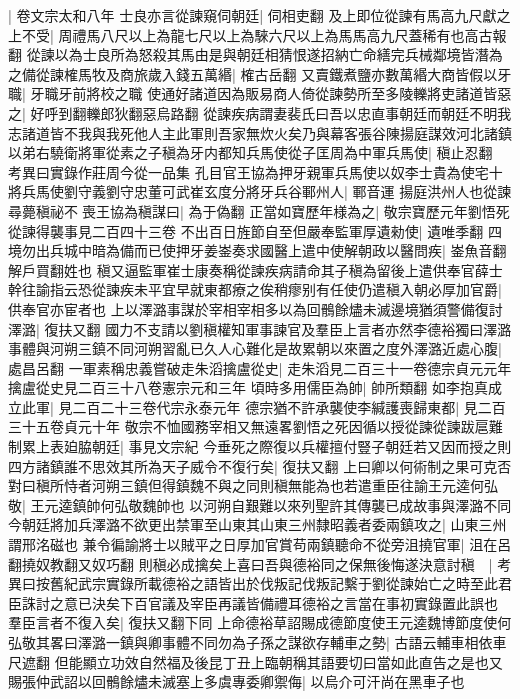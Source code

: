|{
	卷文宗太和八年}
士良亦言從諫窺伺朝廷|{
	伺相吏翻}
及上即位從諫有馬高九尺獻之上不受|{
	周禮馬八尺以上為龍七尺以上為騋六尺以上為馬馬高九尺蓋稀有也高古報翻}
從諫以為士良所為怒殺其馬由是與朝廷相猜恨遂招納亡命繕完兵械鄰境皆潛為之備從諫榷馬牧及商旅歲入錢五萬緡|{
	榷古岳翻}
又賣鐵煮鹽亦數萬緡大商皆假以牙職|{
	牙職牙前將校之職}
使通好諸道因為販易商人倚從諫勢所至多陵轢將吏諸道皆惡之|{
	好呼到翻轢郎狄翻惡烏路翻}
從諫疾病謂妻裴氏曰吾以忠直事朝廷而朝廷不明我志諸道皆不我與我死他人主此軍則吾家無炊火矣乃與幕客張谷陳揚庭謀效河北諸鎮以弟右驍衛將軍從素之子稹為牙内都知兵馬使從子匡周為中軍兵馬使|{
	稹止忍翻　考異曰實錄作莊周今從一品集}
孔目官王協為押牙親軍兵馬使以奴李士貴為使宅十將兵馬使劉守義劉守忠董可武崔玄度分將牙兵谷鄆州人|{
	鄆音運}
揚庭洪州人也從諫尋薨稹祕不喪王協為稹謀曰|{
	為于偽翻}
正當如寶歷年様為之|{
	敬宗寶歷元年劉悟死從諫得襲事見二百四十三卷}
不出百日旌節自至但嚴奉監軍厚遺勑使|{
	遺唯季翻}
四境勿出兵城中暗為備而已使押牙姜崟奏求國醫上遣中使解朝政以醫問疾|{
	崟魚音翻解戶買翻姓也}
稹又逼監軍崔士康奏稱從諫疾病請命其子稹為留後上遣供奉官薛士幹往諭指云恐從諫疾未平宜早就東都療之俟稍瘳别有任使仍遣稹入朝必厚加官爵|{
	供奉官亦宦者也}
上以澤潞事謀於宰相宰相多以為回鶻餘燼未滅邊境猶須警備復討澤潞|{
	復扶又翻}
國力不支請以劉稹權知軍事諫官及羣臣上言者亦然李德裕獨曰澤潞事體與河朔三鎮不同河朔習亂已久人心難化是故累朝以來置之度外澤潞近處心腹|{
	處昌呂翻}
一軍素稱忠義嘗破走朱滔擒盧從史|{
	走朱滔見二百三十一卷德宗貞元元年擒盧從史見二百三十八卷憲宗元和三年}
頃時多用儒臣為帥|{
	帥所類翻}
如李抱真成立此軍|{
	見二百二十三卷代宗永泰元年}
德宗猶不許承襲使李緘護喪歸東都|{
	見二百三十五卷貞元十年}
敬宗不恤國務宰相又無遠畧劉悟之死因循以授從諫從諫跋扈難制累上表廹脇朝廷|{
	事見文宗紀}
今垂死之際復以兵權擅付豎子朝廷若又因而授之則四方諸鎮誰不思效其所為天子威令不復行矣|{
	復扶又翻}
上曰卿以何術制之果可克否對曰稹所恃者河朔三鎮但得鎮魏不與之同則稹無能為也若遣重臣往諭王元逵何弘敬|{
	王元逵鎮帥何弘敬魏帥也}
以河朔自艱難以來列聖許其傳襲已成故事與澤潞不同今朝廷將加兵澤潞不欲更出禁軍至山東其山東三州隸昭義者委兩鎮攻之|{
	山東三州謂邢洺磁也}
兼令徧諭將士以賊平之日厚加官賞苟兩鎮聽命不從旁沮撓官軍|{
	沮在呂翻撓奴教翻又奴巧翻}
則稹必成擒矣上喜曰吾與德裕同之保無後悔遂決意討稹　|{
	考異曰按舊紀武宗實錄所載德裕之語皆出於伐叛記伐叛記繫于劉從諫始亡之時至此君臣誅討之意已決矣下百官議及宰臣再議皆備禮耳德裕之言當在事初實錄置此誤也}
羣臣言者不復入矣|{
	復扶又翻下同}
上命德裕草詔賜成德節度使王元逵魏博節度使何弘敬其畧曰澤潞一鎮與卿事體不同勿為子孫之謀欲存輔車之勢|{
	古語云輔車相依車尺遮翻}
但能顯立功效自然福及後昆丁丑上臨朝稱其語要切曰當如此直告之是也又賜張仲武詔以回鶻餘燼未滅塞上多虞專委卿禦侮|{
	以烏介可汗尚在黑車子也}
